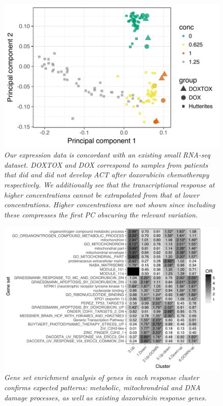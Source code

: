 \documentclass{article}
\begin{document}
{\begin{figure}
\begin{center}
    \includegraphics[width=.6\textwidth]{../figures/burridge_comparison.pdf} %
    \caption{\it{Our expression data is concordant with an existing small RNA-seq dataset\citep{Burridge2016}. DOXTOX and DOX correspond to samples from patients that did and did not develop ACT after doxorubicin chemotherapy respectively. We additionally see that the transcriptional response at higher concentrations cannot be extrapolated from that at lower concentrations. Higher concentrations are not shown since including these compresses the first PC obscuring the relevant variation.}}
    \label{fig:burridge}
    \end{center}
\end{figure}

\begin{figure}
\begin{center}
    \includegraphics[width=1\textwidth]{../figures/cluster_go.pdf} %
    \caption{\it{Gene set enrichment analysis of genes in each response cluster confirms expected patterns: metabolic, mitochrondrial and DNA damage processes, as well as existing doxorubicin response genes.}}
    \label{fig:go}
    \end{center}
\end{figure}

}
\end{document}
